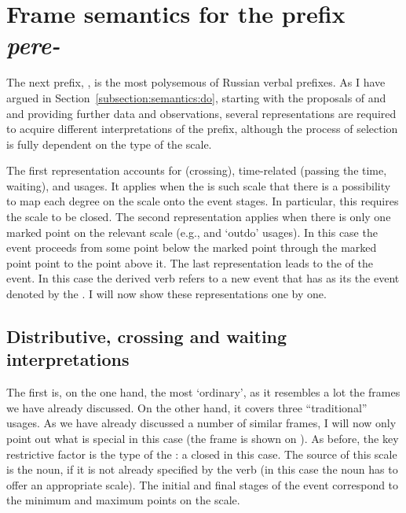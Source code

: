 \section{Frame semantics for the prefix \textit{pere-}}\label{section:frame:pere}
The next prefix, , is the most polysemous of Russian verbal prefixes. As I have argued in Section~\ref{subsection:semantics:do}, starting with the proposals of \citet{Demjjanow:97} and \citet{Kagan:book} and providing further data and observations, several representations are required to acquire different interpretations of the prefix, although the process of selection is fully dependent on the type of the scale.

The first representation accounts for  (crossing), time-related (passing the time, waiting), and  usages. It applies when the  is such scale that there is a possibility to map each degree on the scale onto the event stages. In particular, this requires the scale to be closed. The second representation applies when there is only one marked point on the relevant scale (e.g.,  and `outdo' usages). In this case the event proceeds from some point below the marked point through the marked point point to the point above it. The last representation leads to the  of the event. In this case the derived verb refers to a new event that has as its  the event denoted by the . I will now show these representations one by one. 

\subsection{Distributive, crossing and waiting interpretations}
The first  is, on the one hand, the most `ordinary', as it resembles a lot the frames we have already discussed. On the other hand, it covers three ``traditional'' usages. As we have already discussed a number of similar frames, I will now only point out what is special in this case (the frame is shown on ). As before, the key restrictive factor is the type of the : a closed  in this case. The source of this scale is the noun, if it is not already specified by the verb (in this case the noun has to offer an appropriate scale). The initial and final stages of the event correspond to the minimum and maximum points on the scale. 

